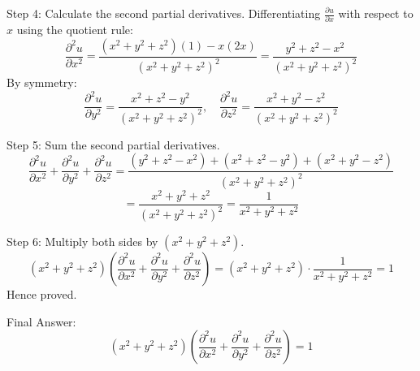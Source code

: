 \documentclass{article}
\begin{document}
Step 4: Calculate the second partial derivatives.
Differentiating $\frac{\partial u}{\partial x}$ with respect to $x$ using the quotient rule:
\[
\frac{\partial^2 u}{\partial x^2} = \frac{(x^2 + y^2 + z^2)(1) - x(2x)}{(x^2 + y^2 + z^2)^2} = \frac{y^2 + z^2 - x^2}{(x^2 + y^2 + z^2)^2}
\]
By symmetry:
\[
\frac{\partial^2 u}{\partial y^2} = \frac{x^2 + z^2 - y^2}{(x^2 + y^2 + z^2)^2}, \quad \frac{\partial^2 u}{\partial z^2} = \frac{x^2 + y^2 - z^2}{(x^2 + y^2 + z^2)^2}
\]

Step 5: Sum the second partial derivatives.
\[
\frac{\partial^2 u}{\partial x^2} + \frac{\partial^2 u}{\partial y^2} + \frac{\partial^2 u}{\partial z^2} = \frac{(y^2 + z^2 - x^2) + (x^2 + z^2 - y^2) + (x^2 + y^2 - z^2)}{(x^2 + y^2 + z^2)^2}
\]
\[
= \frac{x^2 + y^2 + z^2}{(x^2 + y^2 + z^2)^2} = \frac{1}{x^2 + y^2 + z^2}
\]

Step 6: Multiply both sides by $(x^2 + y^2 + z^2)$.
\[
(x^2 + y^2 + z^2)\left(\frac{\partial^2 u}{\partial x^2} + \frac{\partial^2 u}{\partial y^2} + \frac{\partial^2 u}{\partial z^2}\right) = (x^2 + y^2 + z^2) \cdot \frac{1}{x^2 + y^2 + z^2} = 1
\]
Hence proved.

Final Answer:
\[
\boxed{(x^2 + y^2 + z^2)\left(\frac{\partial^2 u}{\partial x^2} + \frac{\partial^2 u}{\partial y^2} + \frac{\partial^2 u}{\partial z^2}\right) = 1}
\]
\end{document}
